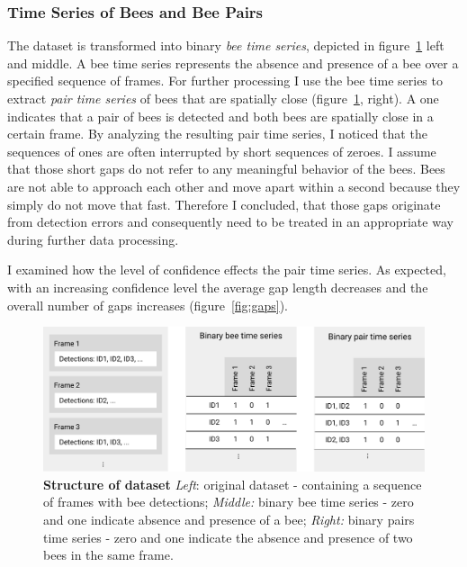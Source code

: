 \subsubsection{Time Series of Bees and Bee Pairs}
\label{subsec:tracking}

The dataset is transformed into binary \emph{bee time series}, depicted in figure~\ref{fig:structure} left and middle.
A bee time series represents the absence and presence of a bee over a specified sequence of frames.
For further processing I use the bee time series to extract \emph{pair time series} of bees that are spatially close (figure~\ref{fig:structure}, right).
A one indicates that a pair of bees is detected and both bees are spatially close in a certain frame.
By analyzing the resulting pair time series, I noticed that the sequences of ones are often interrupted by short sequences of zeroes.
I assume that those short gaps do not refer to any meaningful behavior of the bees. Bees are not able to approach each other and move apart within a second because they simply do not move that fast.
Therefore I concluded, that those gaps originate from detection errors and consequently need to be treated in an appropriate way during further data processing.

I examined how the level of confidence effects the pair time series.
As expected, with an increasing confidence level the average gap length decreases and the overall number of gaps increases (figure~\ref{fig:gaps}).

\begin{figure}[htb]
	\centering
	\includegraphics[width=1.0\textwidth]{Figures/structure}
	\caption[Structure of dataset]{\textbf{Structure of dataset} \emph{Left}: original dataset - containing a sequence of frames with bee detections; \emph{Middle:} binary bee time series - zero and one indicate absence and presence of a bee; \emph{Right:} binary pairs time series - zero and one indicate the absence and presence of two bees in the same frame.}
	\label{fig:structure}
\end{figure}

